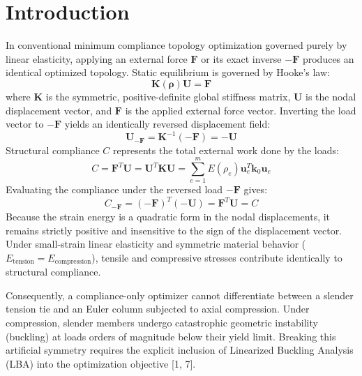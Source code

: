 \documentclass[11pt, a4paper]{article}
\begin{document}
\section{Introduction}
In conventional minimum compliance topology optimization governed purely by linear elasticity, applying an external force $\mathbf{F}$ or its exact inverse $-\mathbf{F}$ produces an identical optimized topology. Static equilibrium is governed by Hooke's law:
\begin{equation}
\mathbf{K}(\boldsymbol{\rho}) \mathbf{U} = \mathbf{F}
\end{equation}
where $\mathbf{K}$ is the symmetric, positive-definite global stiffness matrix, $\mathbf{U}$ is the nodal displacement vector, and $\mathbf{F}$ is the applied external force vector. Inverting the load vector to $-\mathbf{F}$ yields an identically reversed displacement field:
\begin{equation}
\mathbf{U}_{-\mathbf{F}} = \mathbf{K}^{-1}(-\mathbf{F}) = -\mathbf{U}
\end{equation}
Structural compliance $C$ represents the total external work done by the loads:
\begin{equation}
C = \mathbf{F}^T \mathbf{U} = \mathbf{U}^T \mathbf{K} \mathbf{U} = \sum_{e=1}^m E(\rho_e) \mathbf{u}_e^T \mathbf{k}_0 \mathbf{u}_e
\end{equation}
Evaluating the compliance under the reversed load $-\mathbf{F}$ gives:
\begin{equation}
C_{-\mathbf{F}} = (-\mathbf{F})^T (-\mathbf{U}) = \mathbf{F}^T \mathbf{U} = C
\end{equation}
Because the strain energy is a quadratic form in the nodal displacements, it remains strictly positive and insensitive to the sign of the displacement vector. Under small-strain linear elasticity and symmetric material behavior ($E_{\text{tension}} = E_{\text{compression}}$), tensile and compressive stresses contribute identically to structural compliance. 

Consequently, a compliance-only optimizer cannot differentiate between a slender tension tie and an Euler column subjected to axial compression. Under compression, slender members undergo catastrophic geometric instability (buckling) at loads orders of magnitude below their yield limit. Breaking this artificial symmetry requires the explicit inclusion of Linearized Buckling Analysis (LBA) into the optimization objective [1, 7].
\end{document}
